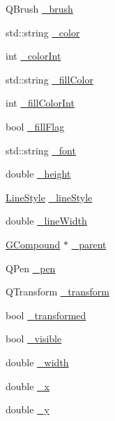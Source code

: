 \begin{DoxyCompactItemize}
\item 
Q\+Brush \mbox{\hyperlink{classGObject_aab24462ec896b596d99911767b0912d0}{\+\_\+brush}}
\item 
std\+::string \mbox{\hyperlink{classGObject_a1134e770ae4315ea8bc1201e2f21da8b}{\+\_\+color}}
\item 
int \mbox{\hyperlink{classGObject_a003fdd343d9b7505c53a8b7a134200ed}{\+\_\+color\+Int}}
\item 
std\+::string \mbox{\hyperlink{classGObject_a179f8d6cee65cd8a54692e32b224392a}{\+\_\+fill\+Color}}
\item 
int \mbox{\hyperlink{classGObject_a751def333a67d651e5b99cc331ecb496}{\+\_\+fill\+Color\+Int}}
\item 
bool \mbox{\hyperlink{classGObject_ad4a55cbcd61b58a4d49666490bb2f103}{\+\_\+fill\+Flag}}
\item 
std\+::string \mbox{\hyperlink{classGObject_aea76ea1a8b5dd7b0a78653277e63b536}{\+\_\+font}}
\item 
double \mbox{\hyperlink{classGObject_ad05df29e7f27fc504abd743e3d8b4e73}{\+\_\+height}}
\item 
\mbox{\hyperlink{classGObject_a86e0f5648542856159bb40775c854aa7}{Line\+Style}} \mbox{\hyperlink{classGObject_a89bafecaafb7c72d55c7efc10b7d0523}{\+\_\+line\+Style}}
\item 
double \mbox{\hyperlink{classGObject_a16e9033665937f13de2e163dc2184aff}{\+\_\+line\+Width}}
\item 
\mbox{\hyperlink{classGCompound}{G\+Compound}} $\ast$ \mbox{\hyperlink{classGObject_ac9452c1eaff70eebddbb318196aa3835}{\+\_\+parent}}
\item 
Q\+Pen \mbox{\hyperlink{classGObject_afb69d172743f868299847174eb1b6bc8}{\+\_\+pen}}
\item 
Q\+Transform \mbox{\hyperlink{classGObject_a475b8860a5f1adb4a1fdc58d1f5c1e32}{\+\_\+transform}}
\item 
bool \mbox{\hyperlink{classGObject_ae4725802fc8d8aaa0ab4bd4781f7e07c}{\+\_\+transformed}}
\item 
bool \mbox{\hyperlink{classGObject_a9312c72508471b7c7a87b540263e1af4}{\+\_\+visible}}
\item 
double \mbox{\hyperlink{classGObject_ab55d85a3371770e6725b1062cf160cd8}{\+\_\+width}}
\item 
double \mbox{\hyperlink{classGObject_a6675b83b27137b8d3aa2ad8133078ea6}{\+\_\+x}}
\item 
double \mbox{\hyperlink{classGObject_a2f0f6aeafddc8a39c578bfa7e22b5f1e}{\+\_\+y}}
\end{DoxyCompactItemize}


